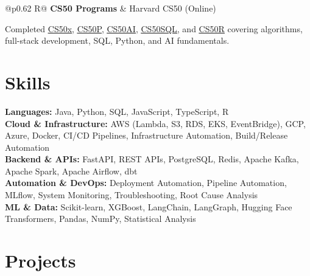 \documentclass[a4paper,10pt]{article}
\newcommand{\ulink}[2]{\href{#1}{\uline{#2}}}
\newcommand{\subheading}[1]{{\color[HTML]{0A0A0A}\fontsize{12}{14}\selectfont\bfseries #1}}
\newcommand{\meta}[1]{{\color[HTML]{5C5C5C}\fontsize{10.5}{12.5}\selectfont #1}}
\begin{document}
\begin{tabularx}{\linewidth}{@{}p{0.62\linewidth} R@{}}
\subheading{CS50 Programs} & \meta{Harvard CS50 (Online)}
\end{tabularx}
\vspace{2pt}
{\color[HTML]{3A3A3A}\fontsize{11}{14}\selectfont Completed \ulink{https://cs50.harvard.edu/certificates/b14b78df-e05c-413e-a607-1dd27303053a}{CS50x}, \ulink{https://cs50.harvard.edu/certificates/32477052-9db4-49c4-a5a4-d7e58429ca2c}{CS50P}, \ulink{https://cs50.harvard.edu/certificates/9cdb4d4a-1250-4f8e-9fd7-191864e0f919}{CS50AI}, \ulink{https://cs50.harvard.edu/certificates/bc486f24-f085-4e61-8536-80940b97a1b9}{CS50SQL}, and \ulink{https://cs50.harvard.edu/certificates/666838e6-a053-4d82-b179-a60fe745fd84}{CS50R} covering algorithms, full-stack development, SQL, Python, and AI fundamentals.}

\vspace{2pt}

\section{Skills}
\vspace{2pt}
{\color[HTML]{0A0A0A}\fontsize{11}{14}\selectfont
\textbf{Languages:} Java, Python, SQL, JavaScript, TypeScript, R \\[2pt]
\textbf{Cloud \& Infrastructure:} AWS (Lambda, S3, RDS, EKS, EventBridge), GCP, Azure, Docker, CI/CD Pipelines, Infrastructure Automation, Build/Release Automation \\[2pt]
\textbf{Backend \& APIs:} FastAPI, REST APIs, PostgreSQL, Redis, Apache Kafka, Apache Spark, Apache Airflow, dbt \\[2pt]
\textbf{Automation \& DevOps:} Deployment Automation, Pipeline Automation, MLflow, System Monitoring, Troubleshooting, Root Cause Analysis \\[2pt]
\textbf{ML \& Data:} Scikit-learn, XGBoost, LangChain, LangGraph, Hugging Face Transformers, Pandas, NumPy, Statistical Analysis}

\vspace{2pt}

\section{Projects}
\vspace{2pt}
\end{document}
